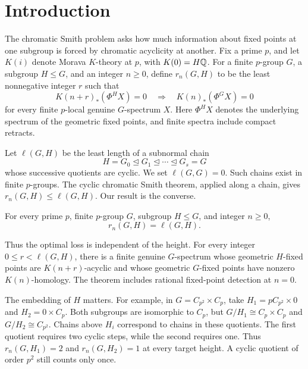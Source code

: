 \section{Introduction}\label{sec:intro}

The chromatic Smith problem asks how much information about fixed points at one subgroup is forced by chromatic acyclicity at another. Fix a prime \(p\), and let \(K(i)\) denote Morava \(K\)-theory at \(p\), with \(K(0)=H\mathbb Q\). For a finite \(p\)-group \(G\), a subgroup \(H\le G\), and an integer \(n\ge0\), define \(r_n(G,H)\) to be the least nonnegative integer \(r\) such that
\begin{equation}\label{eq:def-loss}
 K(n+r)_*(\Phi^H X)=0
 \quad\Longrightarrow\quad
 K(n)_*(\Phi^G X)=0
\end{equation}
for every finite \(p\)-local genuine \(G\)-spectrum \(X\). Here \(\Phi^H X\) denotes the underlying spectrum of the geometric fixed points, and finite spectra include compact retracts.

Let \(\ell(G,H)\) be the least length of a subnormal chain
\[
 H=G_0\trianglelefteq G_1\trianglelefteq\cdots
 \trianglelefteq G_s=G
\]
whose successive quotients are cyclic. We set \(\ell(G,G)=0\). Such chains exist in finite \(p\)-groups. The cyclic chromatic Smith theorem, applied along a chain, gives \(r_n(G,H)\le\ell(G,H)\). Our result is the converse.

\begin{theorem}\label{thm:main}
For every prime \(p\), finite \(p\)-group \(G\), subgroup \(H\le G\), and integer \(n\ge0\),
\[
 \boxed{r_n(G,H)=\ell(G,H).}
\]
\end{theorem}

Thus the optimal loss is independent of the height. For every integer \(0\le r<\ell(G,H)\), there is a finite genuine \(G\)-spectrum whose geometric \(H\)-fixed points are \(K(n+r)\)-acyclic and whose geometric \(G\)-fixed points have nonzero \(K(n)\)-homology. The theorem includes rational fixed-point detection at \(n=0\).

The embedding of \(H\) matters. For example, in
\(G=C_{p^2}\times C_p\), take
\(H_1=pC_{p^2}\times0\) and \(H_2=0\times C_p\).
Both subgroups are isomorphic to \(C_p\), but
\(G/H_1\cong C_p\times C_p\) and \(G/H_2\cong C_{p^2}\).
Chains above \(H_i\) correspond to chains in these quotients.
The first quotient requires two cyclic steps, while the second
requires one. Thus \(r_n(G,H_1)=2\) and \(r_n(G,H_2)=1\)
at every target height. A cyclic quotient of order \(p^2\)
still counts only once.

